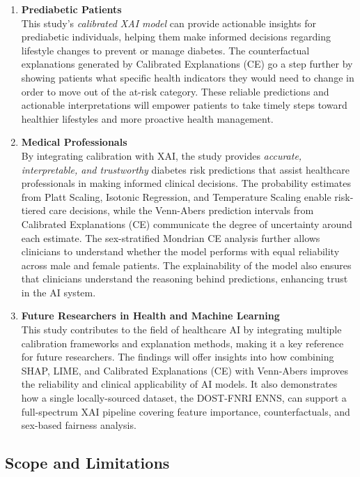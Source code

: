 \begin{enumerate}
    \item \textbf{Prediabetic Patients} \\
    This study's \textit{calibrated XAI model} can provide actionable insights for prediabetic individuals, helping them make informed decisions regarding lifestyle changes to prevent or manage diabetes. The counterfactual explanations generated by Calibrated Explanations (CE) go a step further by showing patients what specific health indicators they would need to change in order to move out of the at-risk category. These reliable predictions and actionable interpretations will empower patients to take timely steps toward healthier lifestyles and more proactive health management.

    \item \textbf{Medical Professionals} \\
    By integrating calibration with XAI, the study provides \textit{accurate, interpretable, and trustworthy} diabetes risk predictions that assist healthcare professionals in making informed clinical decisions. The probability estimates from Platt Scaling, Isotonic Regression, and Temperature Scaling enable risk-tiered care decisions, while the Venn-Abers prediction intervals from Calibrated Explanations (CE) communicate the degree of uncertainty around each estimate. The sex-stratified Mondrian CE analysis further allows clinicians to understand whether the model performs with equal reliability across male and female patients. The explainability of the model also ensures that clinicians understand the reasoning behind predictions, enhancing trust in the AI system.

    \item \textbf{Future Researchers in Health and Machine Learning} \\
    This study contributes to the field of healthcare AI by integrating multiple calibration frameworks and explanation methods, making it a key reference for future researchers. The findings will offer insights into how combining SHAP, LIME, and Calibrated Explanations (CE) with Venn-Abers improves the reliability and clinical applicability of AI models. It also demonstrates how a single locally-sourced dataset, the DOST-FNRI ENNS, can support a full-spectrum XAI pipeline covering feature importance, counterfactuals, and sex-based fairness analysis.
\end{enumerate}


\subsection{Scope and Limitations}

